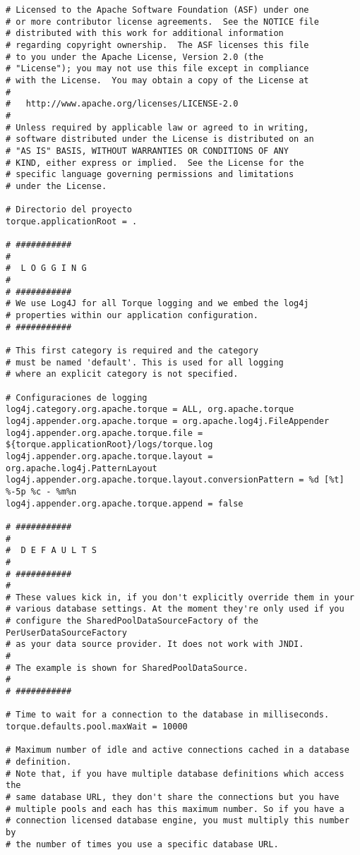 \begin{lstlisting}
# Licensed to the Apache Software Foundation (ASF) under one
# or more contributor license agreements.  See the NOTICE file
# distributed with this work for additional information
# regarding copyright ownership.  The ASF licenses this file
# to you under the Apache License, Version 2.0 (the
# "License"); you may not use this file except in compliance
# with the License.  You may obtain a copy of the License at
#
#   http://www.apache.org/licenses/LICENSE-2.0
#
# Unless required by applicable law or agreed to in writing,
# software distributed under the License is distributed on an
# "AS IS" BASIS, WITHOUT WARRANTIES OR CONDITIONS OF ANY
# KIND, either express or implied.  See the License for the
# specific language governing permissions and limitations
# under the License.

# Directorio del proyecto
torque.applicationRoot = .

# ###########
#
#  L O G G I N G
#
# ###########
# We use Log4J for all Torque logging and we embed the log4j
# properties within our application configuration.
# ###########

# This first category is required and the category
# must be named 'default'. This is used for all logging
# where an explicit category is not specified.

# Configuraciones de logging
log4j.category.org.apache.torque = ALL, org.apache.torque
log4j.appender.org.apache.torque = org.apache.log4j.FileAppender
log4j.appender.org.apache.torque.file = ${torque.applicationRoot}/logs/torque.log
log4j.appender.org.apache.torque.layout = org.apache.log4j.PatternLayout
log4j.appender.org.apache.torque.layout.conversionPattern = %d [%t] %-5p %c - %m%n
log4j.appender.org.apache.torque.append = false

# ###########
#
#  D E F A U L T S
#
# ###########
#
# These values kick in, if you don't explicitly override them in your
# various database settings. At the moment they're only used if you
# configure the SharedPoolDataSourceFactory of the PerUserDataSourceFactory
# as your data source provider. It does not work with JNDI.
#
# The example is shown for SharedPoolDataSource.
#
# ###########

# Time to wait for a connection to the database in milliseconds.
torque.defaults.pool.maxWait = 10000

# Maximum number of idle and active connections cached in a database
# definition.
# Note that, if you have multiple database definitions which access the
# same database URL, they don't share the connections but you have
# multiple pools and each has this maximum number. So if you have a
# connection licensed database engine, you must multiply this number by
# the number of times you use a specific database URL.


\end{lstlisting}
